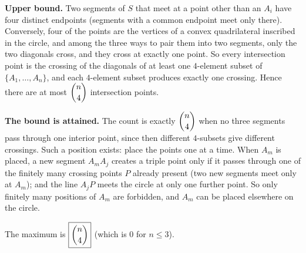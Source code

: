 \textbf{Upper bound.} Two segments of $S$ that meet at a point other than an $A_i$ have four distinct endpoints (segments with a common endpoint meet only there). Conversely, four of the points are the vertices of a convex quadrilateral inscribed in the circle, and among the three ways to pair them into two segments, only the two diagonals cross, and they cross at exactly one point. So every intersection point is the crossing of the diagonals of at least one $4$-element subset of $\{A_1,\dots,A_n\}$, and each $4$-element subset produces exactly one crossing. Hence there are at most $\dbinom n4$ intersection points.

\textbf{The bound is attained.} The count is exactly $\dbinom n4$ when no three segments pass through one interior point, since then different $4$-subsets give different crossings. Such a position exists: place the points one at a time. When $A_m$ is placed, a new segment $A_mA_j$ creates a triple point only if it passes through one of the finitely many crossing points $P$ already present (two new segments meet only at $A_m$); and the line $A_jP$ meets the circle at only one further point. So only finitely many positions of $A_m$ are forbidden, and $A_m$ can be placed elsewhere on the circle.

The maximum is $\boxed{\dbinom n4}$ (which is $0$ for $n\le3$).

